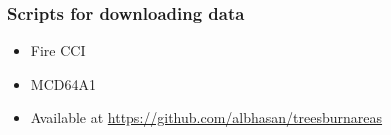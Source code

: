 \documentclass{beamer}
\begin{document}
\begin{frame}[t, allowframebreaks]
\begin{itemize}
    \end{itemize}
\end{frame}



\begin{frame}
    \frametitle{Scripts for downloading data}
    \begin{itemize}
        \item Fire CCI
        \item MCD64A1
        \item Available at \url{https://github.com/albhasan/treesburnareas}
    \end{itemize}
\end{frame}
\end{document}
